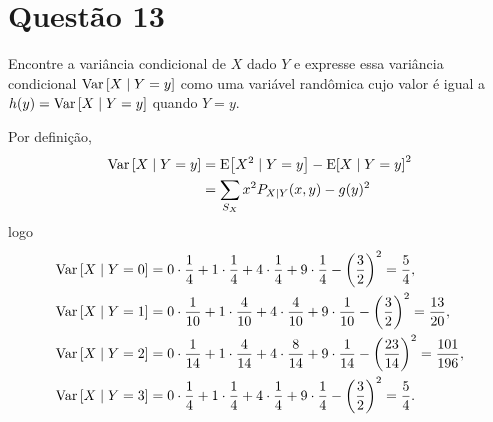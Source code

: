\section{Questão 13}

Encontre a variância condicional de $X$ dado $Y$ e expresse essa variância condicional $\mathrm{Var}\left[X\mid Y=y\right]$
como uma variável randômica cujo valor é igual a 
$h(y) = \mathrm{Var}\left[X\mid Y = y\right]$ quando $Y = y$.

\begin{respostas}
    Por definição, 
    \begin{align}
        \mathrm{Var}\left[X\mid Y=y\right] 
        &= \mathrm{E}\!\left[X^2\mid Y=y\right] - \mathrm{E}\!\left[X\mid Y=y\right]^2 \\
        &= \sum_{S_X} x^2 P_{X\mid Y}(x, y) - g(y)^2
    \end{align}
    logo
    \begin{align}
        \mathrm{Var}\left[X\mid Y=0\right] 
        &= 0\cdot\frac{1}{4} + 1\cdot\frac{1}{4} + 4\cdot\frac{1}{4} + 9\cdot\frac{1}{4} - \left(\frac{3}{2}\right)^2
        = \frac{5}{4},
        \\
        \mathrm{Var}\left[X\mid Y=1\right]
        &= 0\cdot\frac{1}{10} + 1\cdot\frac{4}{10} + 4\cdot\frac{4}{10} + 9\cdot\frac{1}{10} - \left(\frac{3}{2}\right)^2
        = \frac{13}{20},
        \\
        \mathrm{Var}\left[X\mid Y=2\right]
        &= 0\cdot\frac{1}{14} + 1\cdot\frac{4}{14} + 4\cdot\frac{8}{14} + 9\cdot\frac{1}{14} - \left(\frac{23}{14}\right)^2
        = \frac{101}{196},
        \\
        \mathrm{Var}\left[X\mid Y=3\right]
        &= 0\cdot\frac{1}{4} + 1\cdot\frac{1}{4} + 4\cdot\frac{1}{4} + 9\cdot\frac{1}{4} - \left(\frac{3}{2}\right)^2
        = \frac{5}{4}.
    \end{align}
\end{respostas}